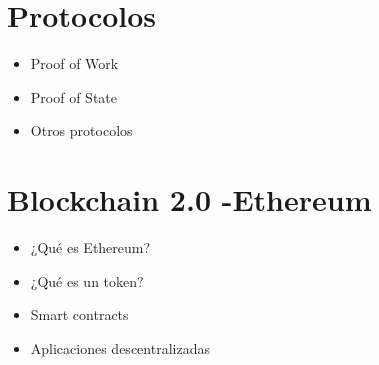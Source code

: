 \documentclass{/home/armando/Documentos/Cursos/LaTeX/Plantillas/lib/temarioptc}
\begin{document}
\section{Protocolos}
\begin{itemize}
	\item Proof of Work
	\item Proof of State
	\item Otros protocolos
\end{itemize}
\section{Blockchain 2.0 -Ethereum}
\begin{itemize}
	\item ¿Qué es Ethereum?
	\item ¿Qué es un token?
	\item Smart contracts
	\item Aplicaciones descentralizadas
\end{itemize}
\end{document}

